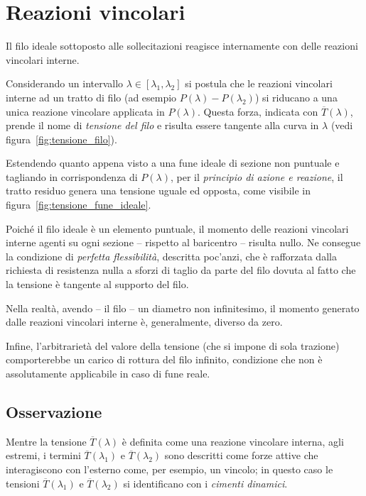 \section*{Reazioni vincolari}
Il filo ideale sottoposto alle sollecitazioni reagisce internamente con delle reazioni vincolari interne.

Considerando un intervallo $\lambda\in[\lambda_1, \lambda_2]$ si postula che le reazioni vincolari interne ad un tratto di filo (ad esempio $P(\lambda) - P(\lambda_2)$) si riducano a una unica reazione vincolare applicata in $P(\lambda)$. Questa forza, indicata con $\overline{T}(\lambda)$, prende il nome di \emph{tensione del filo} e risulta essere tangente alla curva in $\lambda$ (vedi figura~\ref{fig:tensione_filo}).



Estendendo quanto appena visto a una fune ideale di sezione non puntuale e tagliando in corrispondenza di $P(\lambda)$, per il \emph{principio di azione e reazione}, il tratto residuo genera una tensione uguale ed opposta, come visibile in figura~\ref{fig:tensione_fune_ideale}.

Poiché il filo ideale è un elemento puntuale, il momento delle reazioni vincolari interne agenti su ogni sezione -- rispetto al baricentro -- risulta nullo. Ne consegue la condizione di \emph{perfetta flessibilità}, descritta poc'anzi, che è rafforzata dalla richiesta di  resistenza nulla a sforzi di taglio da parte del filo dovuta al fatto che la tensione è tangente al supporto del filo.

Nella realtà, avendo -- il filo -- un diametro non infinitesimo, il momento generato dalle reazioni vincolari interne è, generalmente, diverso da zero.

Infine, l'arbitrarietà del valore della tensione (che si impone di sola trazione) comporterebbe un carico di rottura del filo infinito, condizione che non è assolutamente applicabile in caso di fune reale.

\subsection*{Osservazione}
Mentre la tensione $\overline{T}(\lambda)$ è definita come una reazione vincolare interna, agli estremi, i termini $\overline{T}(\lambda_1)$ e $\overline{T}(\lambda_2)$ sono descritti come forze attive che interagiscono con l'esterno come, per esempio, un vincolo; in questo caso le tensioni $\overline{T}(\lambda_1)$ e $\overline{T}(\lambda_2)$ si identificano con i \emph{cimenti dinamici}.

